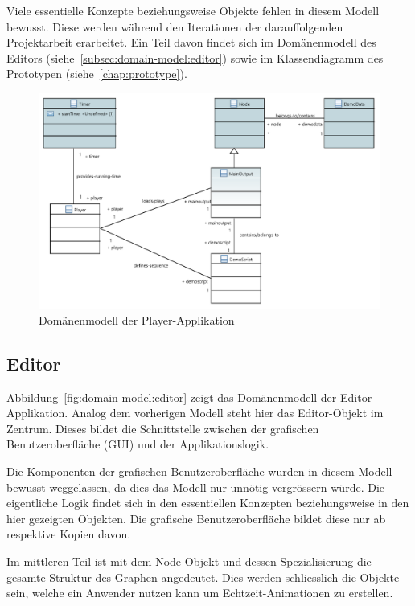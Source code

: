 Viele essentielle Konzepte beziehungsweise Objekte fehlen in diesem Modell
bewusst. Diese werden während den Iterationen der darauffolgenden Projektarbeit
erarbeitet. Ein Teil davon findet sich im Domänenmodell des Editors
(siehe~\autoref{subsec:domain-model:editor}) sowie im Klassendiagramm des Prototypen
(siehe~\autoref{chap:prototype}).

\begin{figure}[H]
    \centering
    \includegraphics{img/player_domain_model.pdf}
    \caption{Domänenmodell der
        Player-Applikation}\label{fig:domain-model:player}
\end{figure}

\subsection{Editor}
\label{subsec:domain-model:editor}

Abbildung~\ref{fig:domain-model:editor} zeigt das Domänenmodell der
Editor-Applikation. Analog dem vorherigen Modell steht hier das Editor-Objekt
im Zentrum. Dieses bildet die Schnittstelle zwischen der grafischen
Benutzeroberfläche (GUI) und der Applikationslogik.

Die Komponenten der grafischen Benutzeroberfläche wurden in diesem Modell
bewusst weggelassen, da dies das Modell nur unnötig vergrössern würde. Die
eigentliche Logik findet sich in den essentiellen Konzepten beziehungsweise in
den hier gezeigten Objekten. Die grafische Benutzeroberfläche bildet diese nur
ab respektive Kopien davon.

Im mittleren Teil ist mit dem Node-Objekt und dessen Spezialisierung die
gesamte Struktur des Graphen angedeutet. Dies werden schliesslich die Objekte
sein, welche ein Anwender nutzen kann um Echtzeit-Animationen zu erstellen.

